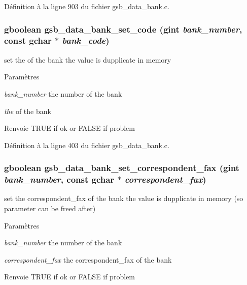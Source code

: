 Définition à la ligne 903 du fichier gsb\_\-data\_\-bank.c.

\subsubsection[{gsb\_\-data\_\-bank\_\-set\_\-code}]{\setlength{\rightskip}{0pt plus 5cm}gboolean gsb\_\-data\_\-bank\_\-set\_\-code (gint {\em bank\_\-number}, \/  const gchar $\ast$ {\em bank\_\-code})}\label{gsb__data__bank_8h_ae0050bb9642075d3aab11bcf303eb6d4}
set the of the bank the value is dupplicate in memory


\begin{DoxyParams}{Paramètres}
\item[{\em bank\_\-number}]the number of the bank \item[{\em the}]of the bank\end{DoxyParams}
\begin{DoxyReturn}{Renvoie}
TRUE if ok or FALSE if problem 
\end{DoxyReturn}


Définition à la ligne 403 du fichier gsb\_\-data\_\-bank.c.

\subsubsection[{gsb\_\-data\_\-bank\_\-set\_\-correspondent\_\-fax}]{\setlength{\rightskip}{0pt plus 5cm}gboolean gsb\_\-data\_\-bank\_\-set\_\-correspondent\_\-fax (gint {\em bank\_\-number}, \/  const gchar $\ast$ {\em correspondent\_\-fax})}\label{gsb__data__bank_8h_a574e0eb451d4d7bc9d10ee6a19d61748}
set the correspondent\_\-fax of the bank the value is dupplicate in memory (so parameter can be freed after)


\begin{DoxyParams}{Paramètres}
\item[{\em bank\_\-number}]the number of the bank \item[{\em correspondent\_\-fax}]the correspondent\_\-fax of the bank\end{DoxyParams}
\begin{DoxyReturn}{Renvoie}
TRUE if ok or FALSE if problem 
\end{DoxyReturn}


